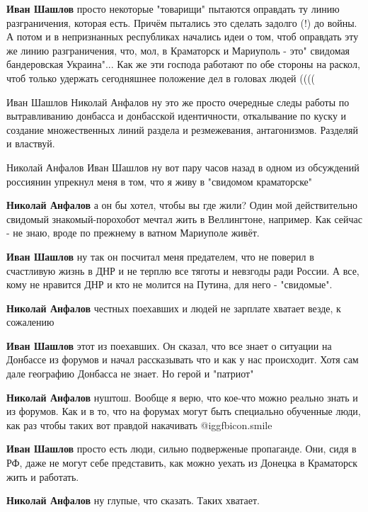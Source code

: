\begin{itemize}
\begin{itemize} %
\textbf{Иван Шашлов} просто некоторые "товарищи" пытаются оправдать ту линию разграничения, которая есть. Причём пытались это сделать задолго (!) до войны. А потом и в непризнанных республиках начались идеи о том, чтоб оправдать эту же линию разграничения, что, мол, в Краматорск и Мариуполь - это" свидомая бандеровская Украина"... Как же эти господа работают по обе стороны на раскол, чтоб только удержать сегодняшнее положение дел в головах людей ((((

Иван Шашлов
Николай Анфалов ну это же просто очередные следы работы по вытравливанию донбасса и донбасской идентичности, откалывание по куску и создание множественных линий раздела и резмежевания, антагонизмов. Разделяй и властвуй.

Николай Анфалов
Иван Шашлов ну вот пару часов назад в одном из обсуждений россиянин упрекнул меня в том, что я живу в "свидомом краматорске"

\textbf{Николай Анфалов} а он бы хотел, чтобы вы где жили?
Один мой действительно свидомый знакомый-порохобот мечтал жить в Веллингтоне, например. Как сейчас - не знаю, вроде по прежнему в ватном Мариуполе живёт.

\textbf{Иван Шашлов} ну так он посчитал меня предателем, что не поверил в счастливую жизнь в ДНР и не терплю все тяготы и невзгоды ради России. А все, кому не нравится ДНР и кто не молится на Путина, для него - "свидомые".

\textbf{Николай Анфалов} честных поехавших и людей не зарплате хватает везде, к сожалению

\textbf{Иван Шашлов} этот из поехавших. Он сказал, что все знает о ситуации на Донбассе из форумов и начал рассказывать что и как у нас происходит. Хотя сам дале географию Донбасса не знает. Но герой и "патриот"

\textbf{Николай Анфалов} нуштош. Вообще я верю, что кое-что можно реально знать и из форумов. Как и в то, что на форумах могут быть специально обученные люди, как раз чтобы таких вот правдой накачивать  @igg{fbicon.smile} 

\textbf{Иван Шашлов} просто есть люди, сильно подверженые пропаганде. Они, сидя в РФ, даже не могут себе представить, как можно уехать из Донецка в Краматорск жить и работать.

\textbf{Николай Анфалов} ну глупые, что сказать. Таких хватает.


\end{itemize}
\end{itemize}
